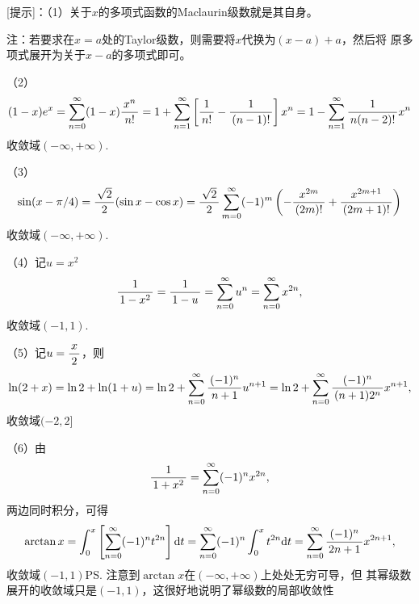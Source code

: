 [提示]：（1）关于$x$的多项式函数的Maclaurin级数就是其自身。

注：若要求在$x=a$处的Taylor级数，则需要将$x$代换为$(x-a)+a$，然后将
原多项式展开为关于$x-a$的多项式即可。

（2）
$$(1-x)e^x=\sum\limits_{n=0}^{\infty}(1-x)\displaystyle\frac{\,{x^n}\,}{\,{n!}\,}
=1+\sum\limits_{n=1}^{\infty}\left[\displaystyle\frac{\,{1}\,}{\,{n!}\,}-\displaystyle\frac{\,{1}\,}{\,{(n-1)!}\,}\right]x^n
=1-\sum\limits_{n=1}^{\infty}\displaystyle\frac{\,{1}\,}{\,{n(n-2)!}\,}x^n$$
收敛域$(-\infty,+\infty)$.

（3）
$$\sin(x-\pi/4)=\displaystyle\frac{\,{\sqrt2}\,}{\,{2}\,}(\sin x-\cos x)
=\displaystyle\frac{\,{\sqrt2}\,}{\,{2}\,}\sum\limits_{m=0}^{\infty}(-1)^m
\left(-\displaystyle\frac{\,{x^{2m}}\,}{\,{(2m)!}\,}+\displaystyle\frac{\,{x^{2m+1}}\,}{\,{(2m+1)!}\,}\right)$$
收敛域$(-\infty,+\infty)$.

（4）记$u=x^2$
$$\displaystyle\frac{\,{1}\,}{\,{1-x^2}\,}=\displaystyle\frac{\,{1}\,}{\,{1-u}\,}=\sum\limits_{n=0}^{\infty}u^n
=\sum\limits_{n=0}^{\infty}x^{2n},$$
收敛域$(-1,1)$.

（5）记$u=\displaystyle\frac{\,{x}\,}{\,{2}\,}$，则
$$\ln(2+x)=\ln2+\ln(1+u)
=\ln2+\sum\limits_{n=0}^{\infty}\displaystyle\frac{\,{(-1)^n}\,}{\,{n+1}\,}u^{n+1}
=\ln2+\sum\limits_{n=0}^{\infty}\displaystyle\frac{\,{(-1)^n}\,}{\,{(n+1)2^n}\,}x^{n+1},$$
收敛域$(-2,2]$

（6）由
$$\displaystyle\frac{\,{1}\,}{\,{1+x^2}\,}=\sum\limits_{n=0}^{\infty}(-1)^nx^{2n},$$
两边同时积分，可得
$$\arctan x=\displaystyle\int_0^x\left[\sum\limits_{n=0}^{\infty}(-1)^nt^{2n}\right]\mathrm{d} t
=\sum\limits_{n=0}^{\infty}(-1)^n\displaystyle\int_0^xt^{2n}\mathrm{d} t
=\sum\limits_{n=0}^{\infty}\displaystyle\frac{\,{(-1)^n}\,}{\,{2n+1}\,}x^{2n+1},$$
收敛域$(-1,1)$\ps{注意到$\arctan x$在$(-\infty,+\infty)$上处处无穷可导，但
其幂级数展开的收敛域只是$(-1,1)$，这很好地说明了幂级数的局部收敛性}


